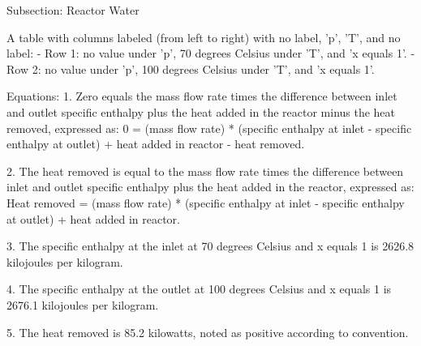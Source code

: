 Subsection: Reactor Water

A table with columns labeled (from left to right) with no label, 'p', 'T', and no label:
- Row 1: no value under 'p', 70 degrees Celsius under 'T', and 'x equals 1'.
- Row 2: no value under 'p', 100 degrees Celsius under 'T', and 'x equals 1'.

Equations:
1. Zero equals the mass flow rate times the difference between inlet and outlet specific enthalpy plus the heat added in the reactor minus the heat removed, expressed as:
   0 = (mass flow rate) * (specific enthalpy at inlet - specific enthalpy at outlet) + heat added in reactor - heat removed.

2. The heat removed is equal to the mass flow rate times the difference between inlet and outlet specific enthalpy plus the heat added in the reactor, expressed as:
   Heat removed = (mass flow rate) * (specific enthalpy at inlet - specific enthalpy at outlet) + heat added in reactor.

3. The specific enthalpy at the inlet at 70 degrees Celsius and x equals 1 is 2626.8 kilojoules per kilogram.

4. The specific enthalpy at the outlet at 100 degrees Celsius and x equals 1 is 2676.1 kilojoules per kilogram.

5. The heat removed is 85.2 kilowatts, noted as positive according to convention.